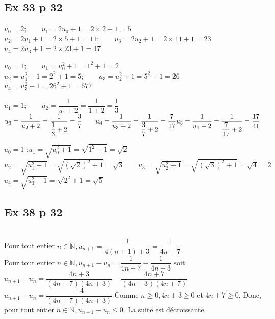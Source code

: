 \documentclass[a4paper,french]{book}
\begin{document}
\subsection*{Ex 33 p 32}

\begin{enumMet}
    \item $u_{0}=2 ;\quad\quad u_{1}=2 u_{0}+1=2 \times 2+1=5$\\
    $u_{2}=2 u_{1}+1=2 \times 5+1=11 ; \quad\quad u_{3}=2 u_{2}+1=2 \times 11+1=23$\\
    $u_{4}=2 u_{3}+1=2 \times 23+1=47$
    \item $u_{0}=1 ; \quad\quad u_{1}=u_{0}^{2}+1=1^{2}+1=2$\\
    $u_{2}=u_{1}^{2}+1=2^{2}+1=5 ;\quad\quad u_{3}=u_{2}^{2}+1=5^{2}+1=26$\\
    $u_{4}=u_{3}^{2}+1=26^{2}+1=677$
    \item $u_{1}=1 ;\quad \quad u_{2}=\dfrac{1}{u_{1}+2}=\dfrac{1}{1+2}=\dfrac{1}{3}$ \\ $u_{3}=\dfrac{1}{u_{2}+2}=\dfrac{1}{\dfrac{1}{3}+2}=\dfrac{3}{7} \quad \quad u_{4}=\dfrac{1}{u_{3}+2}=\dfrac{1}{\dfrac{3}{7}+2}=\dfrac{7}{17} \\ u_{5}=\dfrac{1}{u_{4}+2}=\dfrac{1}{\dfrac{7}{17}+2}=\dfrac{17}{41}$
    \item $u_{0}=1$ ;\quad\quad $u_{1}=\sqrt{u_{0}^{2}+1}=\sqrt{1^{2}+1}=\sqrt{2}$\\
    $u_{2}=\sqrt{u_{1}^{2}+1}=\sqrt{(\sqrt{2})^{2}+1}=\sqrt{3} \quad \quad u_{3}=\sqrt{u_{2}^{2}+1}=\sqrt{(\sqrt{3})^{2}+1}=\sqrt{4}=2$\\
    $u_{4}=\sqrt{u_{3}^{2}+1}=\sqrt{2^{2}+1}=\sqrt{5}$
\end{enumMet}

\subsection*{Ex 38 p 32}
\\

Pour tout entier $n \in \mathbb{N}, u_{n+1}=\dfrac{1}{4(n+1)+3}=\dfrac{1}{4 n+7}$\\
Pour tout entier $n \in \mathbb{N}, u_{n+1}-u_{n}=\dfrac{1}{4 n+7}-\dfrac{1}{4 n+3}$ soit\\ $u_{n+1}-u_{n}=\dfrac{4 n+3}{(4 n+7)(4 n+3)}-\dfrac{4 n+7}{(4 n+3)(4 n+7)}$\\ $u_{n+1}-u_{n}=\dfrac{-4}{(4 n+7)(4 n+3)}$
Comme $n \geqslant 0,4 n+3 \geqslant 0$ et $4 n+7 \geqslant 0$,
Donc, pour tout entier $n \in \mathbb{N}, u_{n+1}-u_{n} \leqslant 0$. La suite est décroissante.
\end{document}

